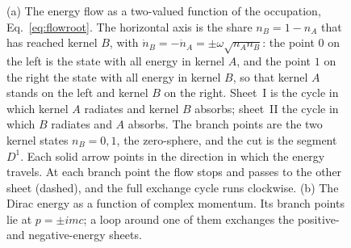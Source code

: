 \documentclass[%
 reprint, amsmath,amssymb, aps, prb, ]{revtex4-2}
\numberwithin{equation}{section}
\begin{document}
\begin{figure}[t!]
\label{fig:riemann}
\vspace{0.4em}
\begin{minipage}{0.95\columnwidth}
\justifying\small
(a) The energy flow as a two-valued function of the occupation, Eq.~\eqref{eq:flowroot}. The horizontal axis is the share $n_B=1-n_A$ that has reached kernel $B$, with $\dot n_B=-\dot n_A=\pm\omega\sqrt{n_An_B}$: the point $0$ on the left is the state with all energy in kernel $A$, and the point $1$ on the right the state with all energy in kernel $B$, so that kernel $A$ stands on the left and kernel $B$ on the right. Sheet~I is the cycle in which kernel $A$ radiates and kernel $B$ absorbs; sheet~II the cycle in which $B$ radiates and $A$ absorbs. The branch points are the two kernel states $n_B=0,1$, the zero-sphere, and the cut is the segment $D^1$. Each solid arrow points in the direction in which the energy travels. At each branch point the flow stops and passes to the other sheet (dashed), and the full exchange cycle runs clockwise. (b) The Dirac energy as a function of complex momentum. Its branch points lie at $p=\pm imc$; a loop around one of them exchanges the positive- and negative-energy sheets.
\end{minipage}
\end{figure}
\end{document}
